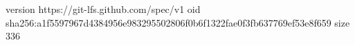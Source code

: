 version https://git-lfs.github.com/spec/v1
oid sha256:a1f5597967d4384956e983295502806f0b6f1322fae0f3fb637769ef53e8f659
size 336
